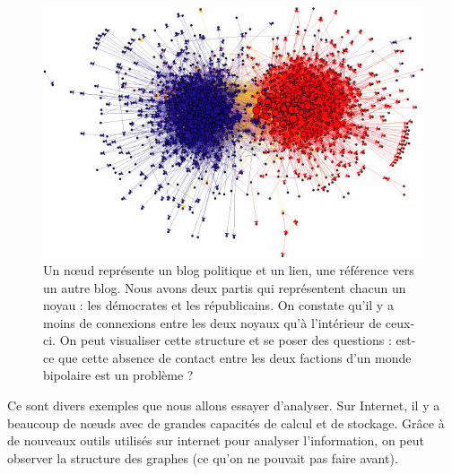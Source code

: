 \begin{figure}[!ht]
\centering
\includegraphics[width=0.65\linewidth]{images/network_structure_of_political_blogs.png}
\caption{Un n\oe ud représente un blog politique et un lien, une référence
    vers un autre blog. Nous avons deux partis qui représentent chacun
    un noyau : les démocrates et les républicains. On constate qu'il y a
    moins de connexions entre les deux noyaux qu'à l'intérieur de
    ceux-ci. On peut visualiser cette structure et se poser des
    questions : est-ce que cette absence de contact entre les deux
factions d'un monde bipolaire est un problème ?}
\end{figure}

\clearpage

Ce sont divers exemples que nous allons essayer d'analyser. Sur Internet, il y a beaucoup de nœuds avec de grandes capacités de calcul et de stockage. Grâce à de nouveaux outils utilisés sur internet pour analyser l'information, on peut observer la structure des graphes (ce qu'on ne pouvait pas faire avant).

